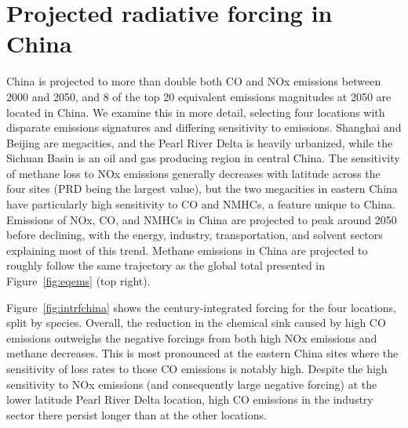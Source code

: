 \section{Projected radiative forcing in China}

China is projected to more than double both CO and NOx emissions between 2000 and 2050, and 8 of the top 20 equivalent emissions magnitudes at 2050 are located in China. We examine this in more detail, selecting four locations with disparate emissions signatures and differing sensitivity to emissions. Shanghai and Beijing are megacities, and the Pearl River Delta is heavily urbanized, while the Sichuan Basin is an oil and gas producing region in central China. The sensitivity of methane loss to NOx emissions generally decreases with latitude across the four sites (PRD being the largest value), but the two megacities in eastern China have particularly high sensitivity to CO and NMHCs, a feature unique to China. Emissions of NOx, CO, and NMHCs in China are projected to peak around 2050 before declining, with the energy, industry, transportation, and solvent sectors explaining most of this trend. Methane emissions in China are projected to roughly follow the same trajectory as the global total presented in Figure~\ref{fig:eqems} (top right).

Figure~\ref{fig:intrfchina} shows the century-integrated forcing for the four locations, split by species. Overall, the reduction in the chemical sink caused by high CO emissions outweighs the negative forcings from both high NOx emissions and methane decreases. This is most pronounced at the eastern China sites where the sensitivity of loss rates to those CO emissions is notably high. Despite the high sensitivity to NOx emissions (and consequently large negative forcing) at the lower latitude Pearl River Delta location, high CO emissions in the industry sector there persist longer than at the other locations.